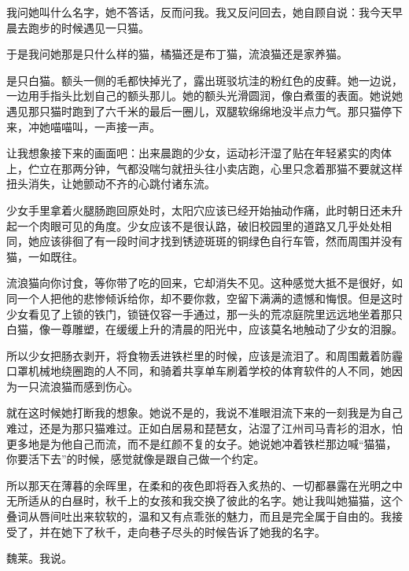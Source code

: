 \documentclass{article}
\begin{document}
我问她叫什么名字，她不答话，反而问我。我又反问回去，她自顾自说：我今天早晨去跑步的时候遇见一只猫。



于是我问她那是只什么样的猫，橘猫还是布丁猫，流浪猫还是家养猫。



是只白猫。额头一侧的毛都快掉光了，露出斑驳坑洼的粉红色的皮藓。她一边说，一边用手指头比划自己的额头那儿。她的额头光滑圆润，像白煮蛋的表面。她说她遇见那只猫时跑到了六千米的最后一圈儿，双腿软绵绵地没半点力气。那只猫停下来，冲她喵喵叫，一声接一声。



让我想象接下来的画面吧：出来晨跑的少女，运动衫汗湿了贴在年轻紧实的肉体上，伫立在那两分钟，气都没喘匀就扭头往小卖店跑，心里只念着那猫不要就这样扭头消失，让她颤动不齐的心跳付诸东流。



少女手里拿着火腿肠跑回原处时，太阳穴应该已经开始抽动作痛，此时朝日还未升起一个肉眼可见的角度。少女应该不是很认路，破旧校园里的道路又几乎处处相同，她应该徘徊了有一段时间才找到锈迹斑斑的铜绿色自行车管，然而周围并没有猫，一如既往。



流浪猫向你讨食，等你带了吃的回来，它却消失不见。这种感觉大抵不是很好，如同一个人把他的悲惨倾诉给你，却不要你救，空留下满满的遗憾和悔恨。但是这时少女看见了上锁的铁门，锁链仅容一手通过，那一头的荒凉庭院里远远地坐着那只白猫，像一尊雕塑，在缓缓上升的清晨的阳光中，应该莫名地触动了少女的泪腺。



所以少女把肠衣剥开，将食物丢进铁栏里的时候，应该是流泪了。和周围戴着防霾口罩机械地绕圈跑的人不同，和骑着共享单车刷着学校的体育软件的人不同，她因为一只流浪猫而感到伤心。



就在这时候她打断我的想象。她说不是的，我说不准眼泪流下来的一刻我是为自己难过，还是为那只猫难过。正如白居易和琵琶女，沾湿了江州司马青衫的泪水，怕更多地是为他自己而流，而不是红颜不复的女子。她说她冲着铁栏那边喊“猫猫，你要活下去”的时候，感觉就像是跟自己做一个约定。



所以那天在薄暮的余晖里，在柔和的夜色即将吞入炙热的、一切都暴露在光明之中无所适从的白昼时，秋千上的女孩和我交换了彼此的名字。她让我叫她猫猫，这个叠词从唇间吐出来软软的，温和又有点乖张的魅力，而且是完全属于自由的。我接受了，并在她下了秋千，走向巷子尽头的时候告诉了她我的名字。



魏莱。我说。
\end{document}
